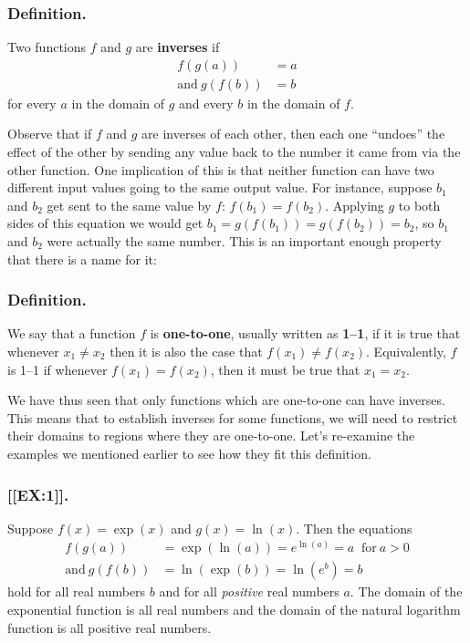 \subsubsection{Definition.}
Two functions $f$ and $g$ are {\bf inverses} if
\begin{align*}
	f(g(a)) &=  a  \\
	\mbox{and} \ g(f(b)) &=  b
\end{align*}
for every $a$ in the domain of $g$ and every $b$ in the domain of $f$.


Observe that if $f$ and $g$ are inverses of each other, then each one ``undoes'' the effect of the other by sending any value back to the number it came from via the other function.  One implication 
of this is that neither function can have two different input values going to the same output value.  For instance, suppose $b_1$ and $b_2$ get sent to the same value by $f$: $f(b_1)=f(b_2)$.  Applying $g$ to both sides of this equation we would get $b_1=g(f(b_1))=g(f(b_2))=b_2$, so $b_1$ and $b_2$ were actually the same number.  This is an important enough property that there is a name for it:




\subsubsection{Definition.}
We say that a function $f$ is {\bf one-to-one}, usually written as {\bf 1--1}, if it is true that whenever $x_1\neq x_2$ then it is also the case that  $f(x_1)\neq f(x_2)$.  Equivalently, $f$ is 1--1 if whenever $f(x_1)=f(x_2)$, then it must be true that $x_1=x_2$.




We have thus seen that only functions which are one-to-one can have
inverses.  This means that to establish inverses for some functions,
we will need to restrict their domains to regions where they are
one-to-one.  Let's re-examine the examples we mentioned earlier to see
how they fit this definition.




\subsubsection{[[EX:1]].}
Suppose $f(x)=\exp(x)$ and $g(x)=\ln(x)$.  Then the
equations
\begin{align*}
f(g(a)) & =  \exp(\ln(a)) = e^{\displaystyle \ln(a)} 
        = a \;\; \mbox{for}\ a>0 \\
	\mbox{and} \ g(f(b)) & =  \ln(\exp(b)) = 
	\ln(e^{\displaystyle b}) = b 
\end{align*}
hold for all real numbers $b$ and for all {\em positive\/} real
numbers $a$.  The domain of the exponential function is all real
numbers and the domain of the natural logarithm function is all
positive real numbers.





